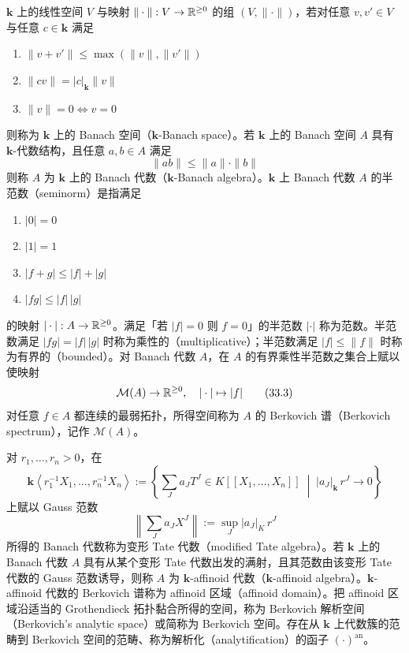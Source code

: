 $\mathbf{k}$ 上的线性空间 $V$ 与映射 $\|\cdot\| : V \to \mathbb{R}^{\ge 0}$ 的组 $(V, \|\cdot\|)$，若对任意 $v, v' \in V$ 与任意 $c \in \mathbf{k}$ 满足
\begin{enumerate}[label=\arabic*.]
\item $\|v + v'\| \le \max\left(\|v\|, \|v'\|\right)$
\item $\|cv\| = |c|_{\mathbf{k}}\|v\|$
\item $\|v\| = 0 \Leftrightarrow v = 0$
\end{enumerate}
则称为 $\mathbf{k}$ 上的 Banach 空间（$\mathbf{k}$-Banach space）。若 $\mathbf{k}$ 上的 Banach 空间 $A$ 具有 $\mathbf{k}$-代数结构，且任意 $a, b \in A$ 满足
\begin{equation}
\|ab\| \le \|a\| \cdot \|b\| \tag{33.2}
\end{equation}
则称 $A$ 为 $\mathbf{k}$ 上的 Banach 代数（$\mathbf{k}$-Banach algebra）。$\mathbf{k}$ 上 Banach 代数 $A$ 的半范数（seminorm）是指满足
\begin{enumerate}[label=\arabic*.]
\item $|0| = 0$
\item $|1| = 1$
\item $|f+g| \le |f| + |g|$
\item $|fg| \le |f|\,|g|$
\end{enumerate}
的映射 $|\cdot| : A \to \mathbb{R}^{\ge 0}$。满足「若 $|f| = 0$ 则 $f = 0$」的半范数 $|\cdot|$ 称为范数。半范数满足 $|fg| = |f|\,|g|$ 时称为乘性的（multiplicative）；半范数满足 $|f| \le \|f\|$ 时称为有界的（bounded）。对 Banach 代数 $A$，在 $A$ 的有界乘性半范数之集合上赋以使映射
\begin{equation}
\mathcal{M}(A) \to \mathbb{R}^{\ge 0},\quad |\cdot| \mapsto |f| \tag{33.3}
\end{equation}
对任意 $f \in A$ 都连续的最弱拓扑，所得空间称为 $A$ 的 Berkovich 谱（Berkovich spectrum），记作 $\mathcal{M}(A)$。

对 $r_1, \dots, r_n > 0$，在
\begin{equation}
\mathbf{k}\left\langle r_1^{-1}X_1, \dots, r_n^{-1}X_n\right\rangle := \left\{\sum_{J} a_J T^J \in K[[X_1, \dots, X_n]] \;\middle|\; |a_J|_{\mathbf{k}}\, r^J \to 0\right\} \tag{33.4}
\end{equation}
上赋以 Gauss 范数
\begin{equation}
\left\|\sum_{J} a_J X^J\right\| := \sup_{J} |a_J|_K\, r^J \tag{33.5}
\end{equation}
所得的 Banach 代数称为变形 Tate 代数（modified Tate algebra）。若 $\mathbf{k}$ 上的 Banach 代数 $A$ 具有从某个变形 Tate 代数出发的满射，且其范数由该变形 Tate 代数的 Gauss 范数诱导，则称 $A$ 为 $\mathbf{k}$-affinoid 代数（$\mathbf{k}$-affinoid algebra）。$\mathbf{k}$-affinoid 代数的 Berkovich 谱称为 affinoid 区域（affinoid domain）。把 affinoid 区域沿适当的 Grothendieck 拓扑黏合所得的空间，称为 Berkovich 解析空间（Berkovich's analytic space）或简称为 Berkovich 空间。存在从 $\mathbf{k}$ 上代数簇的范畴到 Berkovich 空间的范畴、称为解析化（analytification）的函子 $(\cdot)^{\mathrm{an}}$。

